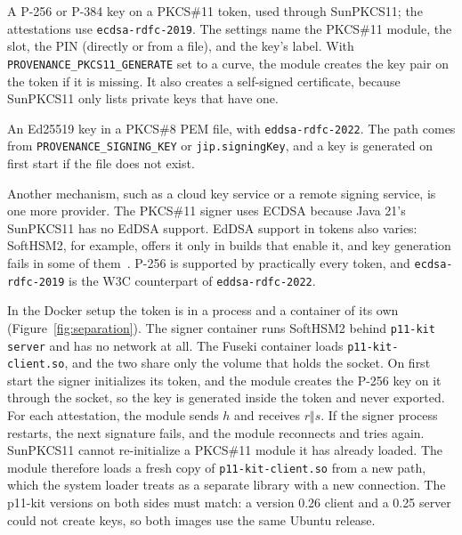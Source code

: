 \documentclass[11pt,a4paper]{article}
\newcommand{\code}[1]{\texttt{#1}}
\begin{document}
\begin{description}[style=nextline, leftmargin=1.5em, font=\normalfont\code]
\item[pkcs11 (default)] A P-256 or P-384 key on a PKCS\#11 token, used through SunPKCS11; the
  attestations use \code{ecdsa-rdfc-2019}. The settings name the PKCS\#11 module, the slot, the PIN
  (directly or from a file), and the key's label. With \code{PROVENANCE\_PKCS11\_GENERATE} set
  to a curve, the module creates the key pair on the token if it is missing. It also creates a
self-signed certificate, because SunPKCS11 only lists private keys that have one.
\item[local] An Ed25519 key in a PKCS\#8 PEM file, with \code{eddsa-rdfc-2022}. The path comes
  from \code{PROVENANCE\_SIGNING\_KEY} or \code{jip.signingKey}, and a
  key is generated on first start if the file does not exist.
\end{description}

Another mechanism, such as a cloud key service or a remote signing service, is one more
provider. The PKCS\#11 signer uses ECDSA because Java 21's SunPKCS11 has no EdDSA support.
EdDSA support in tokens also varies: SoftHSM2, for example, offers it only in builds that enable it,
and key generation fails in some of them~\cite{softhsm704}. P-256 is supported by practically
every token, and \code{ecdsa-rdfc-2019} is the W3C counterpart of \code{eddsa-rdfc-2022}.

In the Docker setup the token is in a process and a container of its own
(Figure~\ref{fig:separation}). The signer container runs SoftHSM2 behind \code{p11-kit server}
and has no network at all. The Fuseki container loads \code{p11-kit-client.so}, and the two
share only the volume that holds the socket. On first start the signer initializes its token,
and the module creates the P-256 key on it through the socket, so the key is generated inside
the token and never exported. For each attestation, the module sends $h$ and receives
$r \Vert s$. If the signer process restarts, the next signature fails, and the module reconnects
and tries again. SunPKCS11 cannot re-initialize a PKCS\#11 module it has already loaded. The
module therefore loads a fresh copy of \code{p11-kit-client.so} from a new path, which the system loader treats
as a separate library with a new connection. The p11-kit versions on both sides must match:
a version 0.26 client and a 0.25 server could not create keys, so both images use the same
Ubuntu release.
\end{document}
